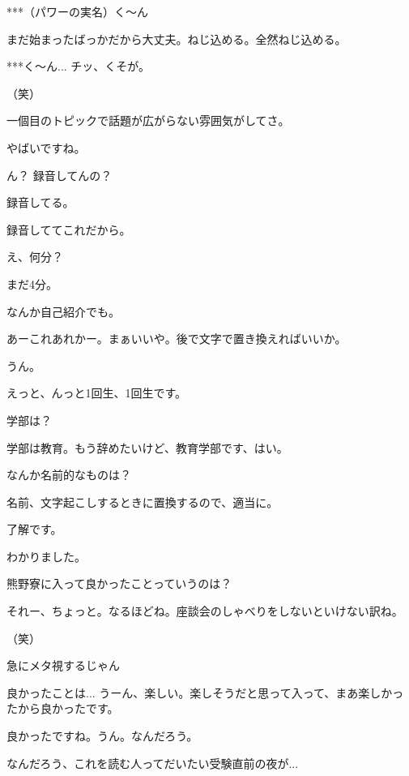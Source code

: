 \begin{multicols}{3}
{        ***（パワーの実名）く～ん

        まだ始まったばっかだから大丈夫。ねじ込める。全然ねじ込める。

        ***く～ん... チッ、くそが。

        （笑）

        一個目のトピックで話題が広がらない雰囲気がしてさ。

        やばいですね。

        ん？ 録音してんの？

        録音してる。

        録音しててこれだから。

        え、何分？

        まだ4分。

        なんか自己紹介でも。

        あーこれあれかー。まぁいいや。後で文字で置き換えればいいか。

        うん。

        えっと、んっと1回生、1回生です。

        学部は？

        学部は教育。もう辞めたいけど、教育学部です、はい。

        なんか名前的なものは？

        名前、文字起こしするときに置換するので、適当に。

        了解です。

        わかりました。

        熊野寮に入って良かったことっていうのは？

        それー、ちょっと。なるほどね。座談会のしゃべりをしないといけない訳ね。

        （笑）

        急にメタ視するじゃん

        良かったことは... うーん、楽しい。楽しそうだと思って入って、まあ楽しかったから良かったです。

        良かったですね。うん。なんだろう。

        なんだろう、これを読む人ってだいたい受験直前の夜が...

}
\end{multicols}
